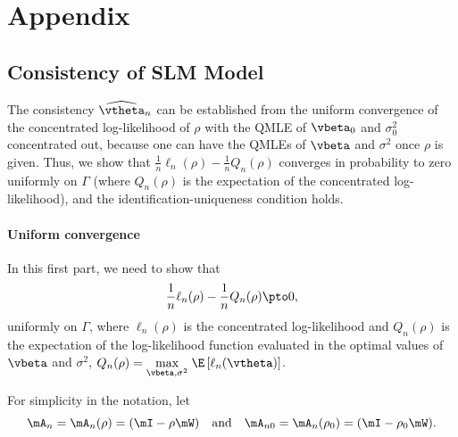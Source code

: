 \documentclass[english,12pt]{book}\usepackage[]{graphicx}\usepackage[]{xcolor}
\begin{document}
\section*{Appendix}
\begin{subappendices}

 \section{Consistency of SLM Model}\label{appendix-consistency}

The consistency $\widehat{\vtheta}_n$ can be established from the uniform convergence of the concentrated log-likelihood of $\rho$ with the QMLE of $\vbeta_0$ and $\sigma_0^2$ concentrated out, because one can have the QMLEs of $\vbeta$ and $\sigma^2$ once $\rho$ is given. Thus, we show that $\frac{1}{n}\ell_n(\rho) - \frac{1}{n}Q_n(\rho)$ converges in probability to zero uniformly on $\Gamma$ (where $Q_n(\rho)$ is the expectation of the concentrated log-likelihood), and the identification-uniqueness condition holds. 

\paragraph{Uniform convergence}

In this first part, we need to show that
\begin{equation*}
  \frac{1}{n}\ell_n(\rho) - \frac{1}{n}Q_n(\rho) \pto 0,
\end{equation*}
%
uniformly on $\Gamma$, where $\ell_n(\rho)$ is the concentrated log-likelihood and $Q_n(\rho)$ is the expectation of the log-likelihood function evaluated in the optimal values of $\vbeta$ and $\sigma^2$, $Q_n(\rho) = \underset{\vbeta, \sigma^2}{\max}\; \E\left[\ell_n(\vtheta)\right]$.

For simplicity in the notation, let 
\begin{equation*}
 \mA_n = \mA_n(\rho) = (\mI - \rho\mW) \quad \mbox{and} \quad  \mA_{n0} = \mA_n(\rho_0) = (\mI - \rho_0\mW). 
\end{equation*}


\end{subappendices}
\end{document}
